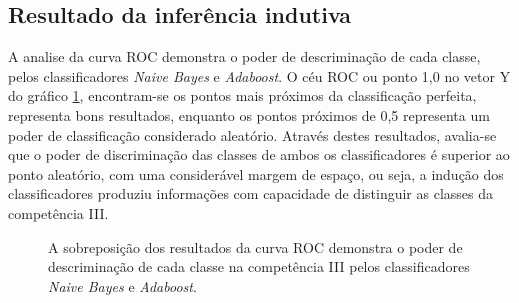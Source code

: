 \subsection{Resultado da inferência indutiva}

A analise da curva ROC demonstra o poder de descriminação de cada classe, pelos 
classificadores \textit{Naive Bayes} e \textit{Adaboost}. O céu ROC ou ponto 
1,0 no vetor Y do gráfico \ref{graphic:roc}, encontram-se os pontos mais 
próximos da classificação perfeita, representa bons resultados, enquanto os 
pontos próximos de 0,5 representa um poder de classificação considerado 
aleatório. Através destes resultados, avalia-se que o poder de discriminação 
das classes de ambos os classificadores é superior ao ponto aleatório, com 
uma considerável margem de espaço, ou seja, a indução dos classificadores 
produziu informações com capacidade de distinguir as classes da competência 
III.

\begin{figure}[H]
    \begin{center}
    \end{center}
    \caption{A sobreposição dos resultados da curva ROC demonstra o poder de 
    descriminação de cada classe na competência III pelos classificadores 
    \textit{Naive Bayes} e \textit{Adaboost}.}
    \label{graphic:roc}
\end{figure}

